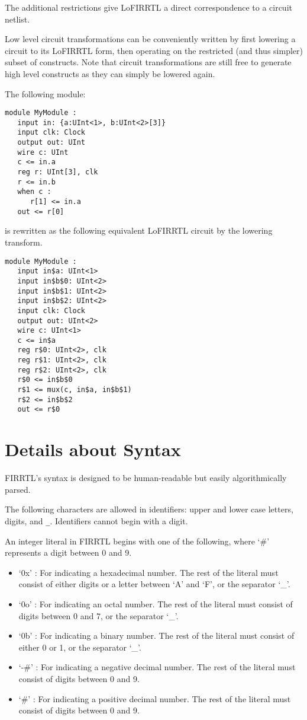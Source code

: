 \documentclass[12pt]{article}
\begin{document}
The additional restrictions give LoFIRRTL a direct correspondence to a circuit netlist.

Low level circuit transformations can be conveniently written by first lowering a circuit to its LoFIRRTL form, then operating on the restricted (and thus simpler) subset of constructs. Note that circuit transformations are still free to generate high level constructs as they can simply be lowered again.

The following module:
\begin{lstlisting}
module MyModule :
   input in: {a:UInt<1>, b:UInt<2>[3]}
   input clk: Clock
   output out: UInt
   wire c: UInt
   c <= in.a
   reg r: UInt[3], clk
   r <= in.b
   when c :
      r[1] <= in.a
   out <= r[0]   
\end{lstlisting}
is rewritten as the following equivalent LoFIRRTL circuit by the lowering transform.
\begin{lstlisting}
module MyModule :
   input in$a: UInt<1>
   input in$b$0: UInt<2>
   input in$b$1: UInt<2>
   input in$b$2: UInt<2>
   input clk: Clock
   output out: UInt<2>
   wire c: UInt<1>
   c <= in$a
   reg r$0: UInt<2>, clk
   reg r$1: UInt<2>, clk
   reg r$2: UInt<2>, clk 
   r$0 <= in$b$0
   r$1 <= mux(c, in$a, in$b$1)
   r$2 <= in$b$2
   out <= r$0
\end{lstlisting}

\section{Details about Syntax}

FIRRTL's syntax is designed to be human-readable but easily algorithmically parsed.

The following characters are allowed in identifiers: upper and lower case letters, digits, and \verb|_|. Identifiers cannot begin with a digit. 

An integer literal in FIRRTL begins with one of the following, where `\#' represents a digit between 0 and 9. 
\begin{itemize}
\item `0x' : For indicating a hexadecimal number. The rest of the literal must consist of either digits or a letter between `A' and `F', or the separator `\_'. 
\item `0o' : For indicating an octal number. The rest of the literal must consist of digits between 0 and 7, or the separator `\_'. 
\item `0b' : For indicating a binary number. The rest of the literal must consist of either 0 or 1, or the separator `\_'.
\item `-\#' : For indicating a negative decimal number. The rest of the literal must consist of digits between 0 and 9.
\item `\#' : For indicating a positive decimal number. The rest of the literal must consist of digits between 0 and 9.
\end{itemize}
\end{document}
